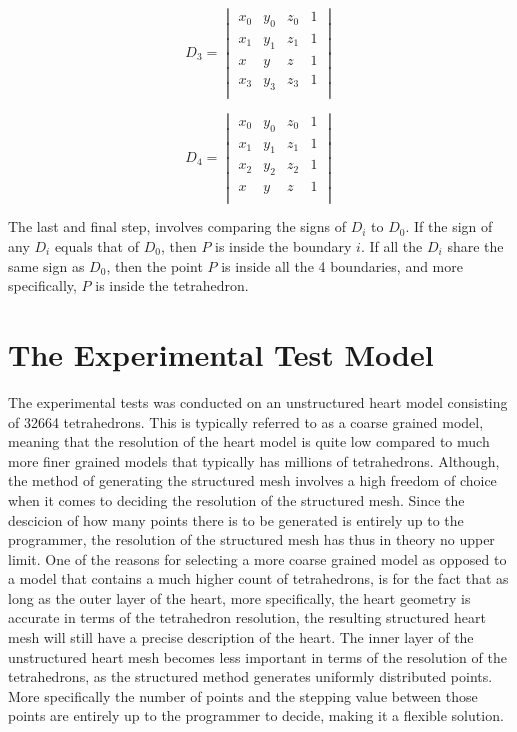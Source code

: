 \[
D_{3} =
\begin{vmatrix}
x_{0} & y_{0} & z_{0} & 1 \\ 
x_{1} & y_{1} & z_{1} & 1 \\ 
x & y & z & 1 \\ 
x_{3} & y_{3} & z_{3} & 1 \\ 
\end{vmatrix}
\]

\[
D_{4} =
\begin{vmatrix}
x_{0} & y_{0} & z_{0} & 1 \\ 
x_{1} & y_{1} & z_{1} & 1 \\ 
x_{2} & y_{2} & z_{2} & 1 \\ 
x & y & z & 1 \\ 
\end{vmatrix}
\]

The last and final step, involves comparing the signs of \(D_{i}\) to \(D_{0}\). If the sign of any \(D_{i}\) equals that of \(D_{0}\), then \(P\) is inside the boundary \(i\). If all the \(D_{i}\) share the same sign as \(D_{0}\), then the point \(P\) is inside all the 4 boundaries, and more specifically, \(P\) is inside the tetrahedron.

\section{The Experimental Test Model}
The experimental tests was conducted on an unstructured heart model consisting of 32664 tetrahedrons. This is typically referred to as a coarse grained model, meaning that the resolution of the heart model is quite low compared to much more finer grained models that typically has millions of tetrahedrons. Although, the method of generating the structured mesh involves a high freedom of choice when it comes to deciding the resolution of the structured mesh. Since the descicion of how many points there is to be generated is entirely up to the programmer, the resolution of the structured mesh has thus in theory no upper limit. One of the reasons for selecting a more coarse grained model as opposed to a model that contains a much higher count of tetrahedrons, is for the fact that as long as the outer layer of the heart, more specifically, the heart geometry is accurate in terms of the tetrahedron resolution, the resulting structured heart mesh will still have a precise description of the heart. The inner layer of the unstructured heart mesh becomes less important in terms of the resolution of the tetrahedrons, as the structured method generates uniformly distributed points. More specifically the number of points and the stepping value between those points are entirely up to the programmer to decide, making it a flexible solution.


